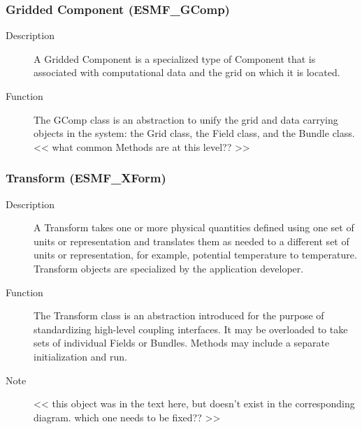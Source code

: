 \subsubsection{Gridded Component (ESMF\_GComp)}
\label{sec:griddedcomponent} 
\begin{description}
\item [Description] A Gridded Component is a specialized type of Component that is associated
with computational data and the grid on which it is located.
\item [Function] The GComp class is an abstraction to unify the grid and data carrying
objects in the system: the Grid class, the Field class, and the Bundle class.
<< what common Methods are at this level?? >>
\end{description}

\subsubsection{Transform (ESMF\_XForm)} 
\begin{description}
\item [Description] A Transform takes one or more physical quantities defined using one set 
of units or representation and translates them as needed to a different set of units or 
representation, for example, potential temperature to temperature.  Transform objects 
are specialized by the application developer.
\item [Function] The Transform class is an abstraction introduced for the
purpose of standardizing high-level coupling interfaces.  It may be overloaded
to take sets of individual Fields or Bundles.  Methods may include a
separate initialization and run. 
\item [Note] << this object was in the text here, but doesn't
exist in the corresponding diagram.  which one needs to be fixed?? >>
\end{description}






